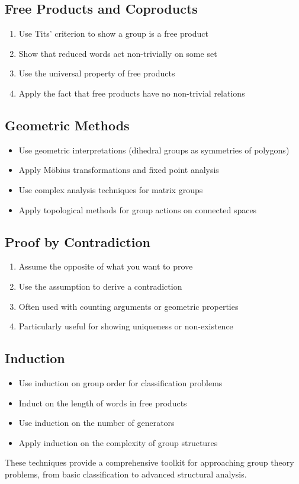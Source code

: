 \subsection*{Free Products and Coproducts}
\begin{enumerate}
\item Use Tits' criterion to show a group is a free product
\item Show that reduced words act non-trivially on some set
\item Use the universal property of free products
\item Apply the fact that free products have no non-trivial relations
\end{enumerate}

\subsection*{Geometric Methods}
\begin{itemize}
\item Use geometric interpretations (dihedral groups as symmetries of polygons)
\item Apply Möbius transformations and fixed point analysis
\item Use complex analysis techniques for matrix groups
\item Apply topological methods for group actions on connected spaces
\end{itemize}

\subsection*{Proof by Contradiction}
\begin{enumerate}
\item Assume the opposite of what you want to prove
\item Use the assumption to derive a contradiction
\item Often used with counting arguments or geometric properties
\item Particularly useful for showing uniqueness or non-existence
\end{enumerate}

\subsection*{Induction}
\begin{itemize}
\item Use induction on group order for classification problems
\item Induct on the length of words in free products
\item Use induction on the number of generators
\item Apply induction on the complexity of group structures
\end{itemize}

These techniques provide a comprehensive toolkit for approaching group theory problems, from basic classification to advanced structural analysis.